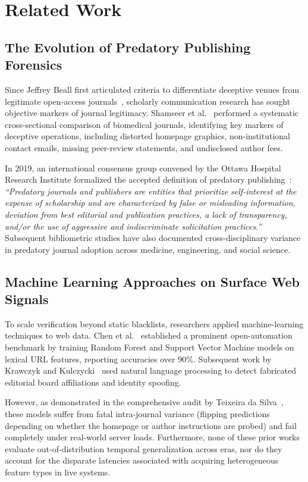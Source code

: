 \documentclass[journal]{IEEEtran}
\begin{document}
\section{Related Work}

\subsection{The Evolution of Predatory Publishing Forensics}
Since Jeffrey Beall first articulated criteria to differentiate deceptive venues from legitimate open-access journals~\cite{beall2015criteria}, scholarly communication research has sought objective markers of journal legitimacy. Shamseer et al.~\cite{shamseer2017potential} performed a systematic cross-sectional comparison of biomedical journals, identifying key markers of deceptive operations, including distorted homepage graphics, non-institutional contact emails, missing peer-review statements, and undisclosed author fees.

In 2019, an international consensus group convened by the Ottawa Hospital Research Institute formalized the accepted definition of predatory publishing~\cite{grudniewicz2019predatory}: \textit{``Predatory journals and publishers are entities that prioritize self-interest at the expense of scholarship and are characterized by false or misleading information, deviation from best editorial and publication practices, a lack of transparency, and/or the use of aggressive and indiscriminate solicitation practices.''} Subsequent bibliometric studies have also documented cross-disciplinary variance in predatory journal adoption across medicine, engineering, and social science.

\subsection{Machine Learning Approaches on Surface Web Signals}
To scale verification beyond static blacklists, researchers applied machine-learning techniques to web data. Chen et al.~\cite{chen2023open} established a prominent open-automation benchmark by training Random Forest and Support Vector Machine models on lexical URL features, reporting accuracies over $90\%$. Subsequent work by Krawczyk and Kulczycki~\cite{krawczyk2023open} used natural language processing to detect fabricated editorial board affiliations and identity spoofing.

However, as demonstrated in the comprehensive audit by Teixeira da Silva~\cite{teixeira2025variation}, these models suffer from fatal intra-journal variance (flipping predictions depending on whether the homepage or author instructions are probed) and fail completely under real-world server loads. Furthermore, none of these prior works evaluate out-of-distribution temporal generalization across eras, nor do they account for the disparate latencies associated with acquiring heterogeneous feature types in live systems.
\end{document}
